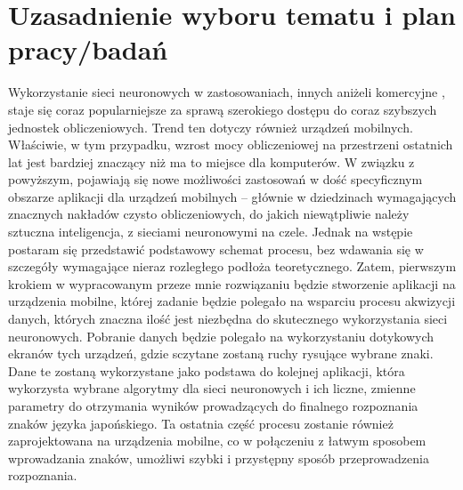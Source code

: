 \section{Uzasadnienie wyboru tematu i plan pracy/badań}
\iffalse
W tym podrozdziale należy szczegółowo uzasadnić dlaczego wybrany został taki a~nie inny temat pracy. Trzeba przede wszystkim zaprezentować aktualny stan wiedzy w~danej dziedzinie. Oznacza to konieczność omówienia książek (ew. artykułów naukowych bądź dokumentacji technicznej) z~których będzie się korzystać w~trakcie rozprawy. Następnie należy wskazać -- tym razem już konkretnie -- co nowego zamierza się zrobić. Podstawowymi celami tego podrozdziału jest wprowadzenie czytelnika w~aktualny stand danej dziedziny i~przekonanie go, że naprawdę warto zajmować się podjętym tematem.

{\color{red} Tutaj niestety będę potrzebował więcej czasu aby odświeżyć znajomość literatury, gdyż przez ten okres czasu przestałem być na bieżąco.}
\fi

Wykorzystanie sieci neuronowych w zastosowaniach, innych aniżeli komercyjne , staje się coraz popularniejsze za sprawą szerokiego dostępu do coraz szybszych jednostek obliczeniowych. Trend ten dotyczy również urządzeń mobilnych. Właściwie, w tym przypadku, wzrost mocy obliczeniowej na przestrzeni ostatnich lat jest bardziej znaczący niż ma to miejsce dla komputerów. W związku z powyższym, pojawiają się nowe możliwości zastosowań w dość specyficznym obszarze aplikacji dla urządzeń mobilnych -- głównie w dziedzinach wymagających znacznych nakładów czysto obliczeniowych, do jakich niewątpliwie należy sztuczna inteligencja, z sieciami neuronowymi na czele.  Jednak na wstępie postaram się przedstawić podstawowy schemat procesu, bez wdawania się w szczegóły wymagające nieraz rozległego podłoża teoretycznego. Zatem, pierwszym krokiem w wypracowanym przeze mnie rozwiązaniu będzie stworzenie aplikacji na urządzenia mobilne, której zadanie będzie polegało na wsparciu procesu akwizycji danych, których znaczna ilość jest niezbędna do skutecznego wykorzystania sieci neuronowych. Pobranie danych będzie polegało na wykorzystaniu dotykowych ekranów tych urządzeń, gdzie sczytane zostaną ruchy rysujące wybrane znaki. Dane te zostaną wykorzystane jako podstawa do kolejnej aplikacji, która wykorzysta wybrane algorytmy dla sieci neuronowych i ich liczne, zmienne parametry do otrzymania wyników prowadzących do finalnego rozpoznania znaków języka japońskiego. Ta ostatnia część procesu zostanie również zaprojektowana na urządzenia mobilne, co w połączeniu z łatwym sposobem wprowadzania znaków, umożliwi szybki i przystępny sposób przeprowadzenia rozpoznania.

